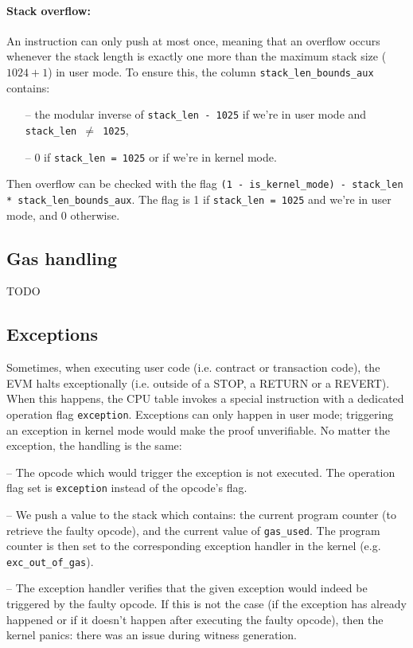 \paragraph*{Stack overflow:}
An instruction can only push at most once, meaning that an overflow occurs whenever the stack length is exactly one more than the maximum stack size ($1024+1$) in user mode.
To ensure this, the column \texttt{stack\_len\_bounds\_aux} contains:

\begin{itemize}
  \item[--] the modular inverse of \texttt{stack\_len - 1025} if we're in user mode and \texttt{stack\_len $\neq$ 1025},
  \item[--] 0 if \texttt{stack\_len = 1025} or if we're in kernel mode.
\end{itemize}
Then overflow can be checked with the flag
\texttt{(1 - is\_kernel\_mode) - stack\_len * stack\_len\_bounds\_aux}.
The flag is 1 if \texttt{stack\_len = 1025} and we're in user mode, and 0 otherwise.

\subsection{Gas handling}

TODO

\subsection{Exceptions}

Sometimes, when executing user code (i.e. contract or transaction code), the EVM halts exceptionally (i.e. outside of a STOP, a RETURN or a REVERT).
When this happens, the CPU table invokes a special instruction with a dedicated operation flag \texttt{exception}.
Exceptions can only happen in user mode; triggering an exception in kernel mode would make the proof unverifiable.
No matter the exception, the handling is the same:

-- The opcode which would trigger the exception is not executed. The operation flag set is \texttt{exception} instead of the opcode's flag.

-- We push a value to the stack which contains: the current program counter (to retrieve the faulty opcode), and the current value of \texttt{gas\_used}.
The program counter is then set to the corresponding exception handler in the kernel (e.g. \texttt{exc\_out\_of\_gas}).

-- The exception handler verifies that the given exception would indeed be triggered by the faulty opcode. If this is not the case (if the exception has already happened or if it doesn't happen after executing
the faulty opcode), then the kernel panics: there was an issue during witness generation.

